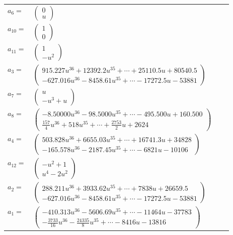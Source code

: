 \documentclass[1p]{elsarticle_modified}
\theoremstyle{definition}
\begin{document}
\begin{tabular}{m{7pt} m{180pt} m{7pt} m{180pt} }
\flushright $a_{6}=$&$\begin{pmatrix}0\\u\end{pmatrix}$ \\
\flushright $a_{10}=$&$\begin{pmatrix}1\\0\end{pmatrix}$ \\
\flushright $a_{11}=$&$\begin{pmatrix}1\\- u^2\end{pmatrix}$ \\
\flushright $a_{3}=$&$\begin{pmatrix}915.227 u^{36}+12392.2 u^{35}+\cdots+25110.5 u+80540.5\\-627.016 u^{36}-8458.61 u^{35}+\cdots-17272.5 u-53881\end{pmatrix}$ \\
\flushright $a_{7}=$&$\begin{pmatrix}u\\- u^3+u\end{pmatrix}$ \\
\flushright $a_{8}=$&$\begin{pmatrix}-8.50000 u^{36}-98.5000 u^{35}+\cdots-495.500 u+160.500\\\frac{157}{4} u^{36}+518 u^{35}+\cdots+\frac{2753}{2} u+2624\end{pmatrix}$ \\
\flushright $a_{4}=$&$\begin{pmatrix}503.828 u^{36}+6655.03 u^{35}+\cdots+16741.3 u+34828\\-165.578 u^{36}-2187.45 u^{35}+\cdots-6821 u-10106\end{pmatrix}$ \\
\flushright $a_{12}=$&$\begin{pmatrix}- u^2+1\\u^4-2 u^2\end{pmatrix}$ \\
\flushright $a_{2}=$&$\begin{pmatrix}288.211 u^{36}+3933.62 u^{35}+\cdots+7838 u+26659.5\\-627.016 u^{36}-8458.61 u^{35}+\cdots-17272.5 u-53881\end{pmatrix}$ \\
\flushright $a_{1}=$&$\begin{pmatrix}-410.313 u^{36}-5606.69 u^{35}+\cdots-11464 u-37783\\-\frac{3733}{16} u^{36}-\frac{24335}{8} u^{35}+\cdots-8416 u-13816\end{pmatrix}$ \\

\end{tabular}
\end{document}

